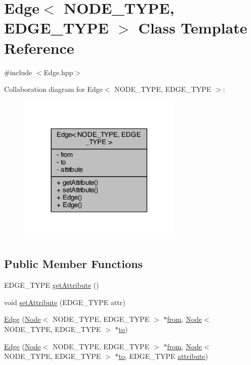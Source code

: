 \hypertarget{class_edge}{\section{Edge$<$ N\+O\+D\+E\+\_\+\+T\+Y\+P\+E, E\+D\+G\+E\+\_\+\+T\+Y\+P\+E $>$ Class Template Reference}
\label{class_edge}
}


{\ttfamily \#include $<$Edge.\+hpp$>$}



Collaboration diagram for Edge$<$ N\+O\+D\+E\+\_\+\+T\+Y\+P\+E, E\+D\+G\+E\+\_\+\+T\+Y\+P\+E $>$\+:\nopagebreak
\begin{figure}[H]
\begin{center}
\leavevmode
\includegraphics[width=222pt]{class_edge__coll__graph}
\end{center}
\end{figure}
\subsection*{Public Member Functions}
\begin{DoxyCompactItemize}
\item 
E\+D\+G\+E\+\_\+\+T\+Y\+P\+E \hyperlink{class_edge_a3352ae81439c772a0ebe640f14f8b910}{get\+Attribute} ()
\item 
void \hyperlink{class_edge_aa63f7fac23602924d2e19f1389a93620}{set\+Attribute} (E\+D\+G\+E\+\_\+\+T\+Y\+P\+E attr)
\item 
\hyperlink{class_edge_a16c5157732e48a737ca0a1d7841e8e19}{Edge} (\hyperlink{class_node}{Node}$<$ N\+O\+D\+E\+\_\+\+T\+Y\+P\+E, E\+D\+G\+E\+\_\+\+T\+Y\+P\+E $>$ $\ast$\hyperlink{class_edge_a1bffa41df2941b7d55c59a5031f78e14}{from}, \hyperlink{class_node}{Node}$<$ N\+O\+D\+E\+\_\+\+T\+Y\+P\+E, E\+D\+G\+E\+\_\+\+T\+Y\+P\+E $>$ $\ast$\hyperlink{class_edge_a7ba6dee1554e4a0a7cf69862e90fdd85}{to})
\item 
\hyperlink{class_edge_a6d1f57f17db61020c1e51c09ff8ab7bb}{Edge} (\hyperlink{class_node}{Node}$<$ N\+O\+D\+E\+\_\+\+T\+Y\+P\+E, E\+D\+G\+E\+\_\+\+T\+Y\+P\+E $>$ $\ast$\hyperlink{class_edge_a1bffa41df2941b7d55c59a5031f78e14}{from}, \hyperlink{class_node}{Node}$<$ N\+O\+D\+E\+\_\+\+T\+Y\+P\+E, E\+D\+G\+E\+\_\+\+T\+Y\+P\+E $>$ $\ast$\hyperlink{class_edge_a7ba6dee1554e4a0a7cf69862e90fdd85}{to}, E\+D\+G\+E\+\_\+\+T\+Y\+P\+E \hyperlink{class_edge_ae49cc056dfa848b0a1beef821d81a31d}{attribute})
\end{DoxyCompactItemize}
